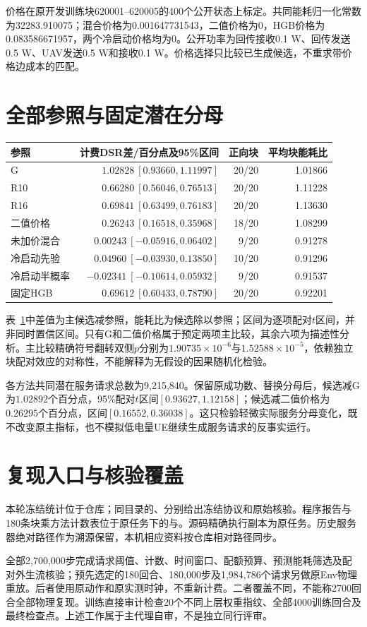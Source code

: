 价格在原开发训练块620001--620005的400个公开状态上标定。共同能耗归一化常数为32283.910075；混合价格为0.001647731543，二值价格为0，HGB价格为0.083586671957，两个冷启动价格均为0。公开功率为回传接收0.1 W、回传发送0.5 W、UAV发送0.5 W和接收0.1 W。价格选择只比较已生成候选，不重求带价格边成本的匹配。

\section{全部参照与固定潜在分母}
\begin{table}[!htbp]
\centering
{}
\label{tab:cost-all-contrasts}
\small
\begin{tabular}{lrrr}
\toprule
参照 & 计费DSR差/百分点及95\%区间 & 正向块 & 平均块能耗比\\
\midrule
G & $1.02828\ [0.93660,1.11997]$ & 20/20 & 1.01866\\
R10 & $0.66280\ [0.56046,0.76513]$ & 20/20 & 1.11228\\
R16 & $0.69841\ [0.63499,0.76183]$ & 20/20 & 1.13630\\
二值价格 & $0.26243\ [0.16518,0.35968]$ & 18/20 & 1.08299\\
未加价混合 & $0.00243\ [-0.05916,0.06402]$ & 9/20 & 0.91278\\
冷启动先验 & $0.04960\ [-0.03930,0.13850]$ & 10/20 & 0.91296\\
冷启动半概率 & $-0.02341\ [-0.10614,0.05932]$ & 9/20 & 0.91537\\
固定HGB & $0.69612\ [0.60433,0.78790]$ & 20/20 & 0.92201\\
\bottomrule
\end{tabular}
\end{table}
表~\ref{tab:cost-all-contrasts}中差值为主候选减参照，能耗比为候选除以参照；区间为逐项配对$t$区间，并非同时置信区间。只有G和二值价格属于预定两项主比较，其余六项为描述性分析。主比较精确符号翻转双侧$p$分别为$1.90735\times10^{-6}$与$1.52588\times10^{-5}$，依赖独立块配对效应的对称性，不能解释为无假设的因果随机化检验。

各方法共同潜在服务请求总数为9,215,840。保留原成功数、替换分母后，候选减G为$1.02892$个百分点，95\%配对$t$区间$[0.93627,1.12158]$；候选减二值价格为$0.26295$个百分点，区间$[0.16552,0.36038]$。这只检验轻微实际服务分母变化，既不改变原主指标，也不模拟低电量UE继续生成服务请求的反事实运行。

\section{复现入口与核验覆盖}
本轮冻结统计位于仓库\allowbreak{}；同目录的、分别给出冻结协议和原始核验。程序报告与180条块乘方法计数表位于原任务下的与。源码精确执行副本为原任务。历史服务器绝对路径作为溯源保留，本机相应资料按仓库相对路径同步。

全部2,700,000步完成请求阈值、计数、时间窗口、配额预算、预测能耗筛选及配对外生流核验；预先选定的180回合、180,000步及1,984,786个请求另做原Env物理重放。后者使用原动作和原实测时钟，不重新计费。二者覆盖不同，不能称2700回合全部物理复现。训练直接审计检查20个不同上层权重指纹、全部4000训练回合及最终检查点。上述工作属于主代理自审，不是独立同行评审。
